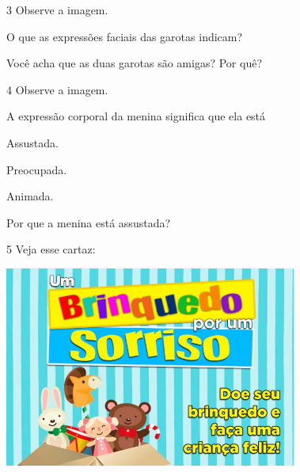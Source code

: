 \num{3} Observe a imagem.


\begin{escolha}
\item O que as expressões faciais das garotas indicam?


\item Você acha que as duas garotas são amigas? Por quê?

\end{escolha}

\num{4} Observe a imagem.


\begin{escolha}
\item A expressão corporal da menina significa que ela está

\begin{boxlist}
 Assustada.

 Preocupada.

 Animada.
\end{boxlist}

\item Por que a menina está assustada?


\end{escolha}

\num{5} Veja esse cartaz:

\includegraphics[width=3.78169in,height=2.59560in]{media/image132.jpeg}

